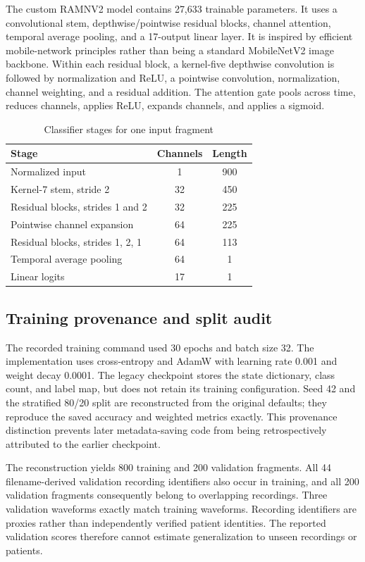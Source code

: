 \documentclass{jpp}
\begin{document}
The custom RAMNV2 model contains 27,633 trainable parameters. It uses a convolutional stem, depthwise/pointwise residual blocks, channel attention, temporal average pooling, and a 17-output linear layer. It is inspired by efficient mobile-network principles rather than being a standard MobileNetV2 image backbone. Within each residual block, a kernel-five depthwise convolution is followed by normalization and ReLU, a pointwise convolution, normalization, channel weighting, and a residual addition. The attention gate pools across time, reduces channels, applies ReLU, expands channels, and applies a sigmoid.

\begin{table}
\centering
\caption{Classifier stages for one input fragment}\label{tab:stages}
\small
\begin{tabular}{lcc}
\hline
Stage & Channels & Length \\
\hline
Normalized input & 1 & 900 \\
Kernel-7 stem, stride 2 & 32 & 450 \\
Residual blocks, strides 1 and 2 & 32 & 225 \\
Pointwise channel expansion & 64 & 225 \\
Residual blocks, strides 1, 2, 1 & 64 & 113 \\
Temporal average pooling & 64 & 1 \\
Linear logits & 17 & 1 \\
\hline
\end{tabular}
\end{table}

\subsection{Training provenance and split audit}

The recorded training command used 30 epochs and batch size 32. The implementation uses cross-entropy and AdamW with learning rate 0.001 and weight decay 0.0001. The legacy checkpoint stores the state dictionary, class count, and label map, but does not retain its training configuration. Seed 42 and the stratified 80/20 split are reconstructed from the original defaults; they reproduce the saved accuracy and weighted metrics exactly. This provenance distinction prevents later metadata-saving code from being retrospectively attributed to the earlier checkpoint.

The reconstruction yields 800 training and 200 validation fragments. All 44 filename-derived validation recording identifiers also occur in training, and all 200 validation fragments consequently belong to overlapping recordings. Three validation waveforms exactly match training waveforms. Recording identifiers are proxies rather than independently verified patient identities. The reported validation scores therefore cannot estimate generalization to unseen recordings or patients.
\end{document}
